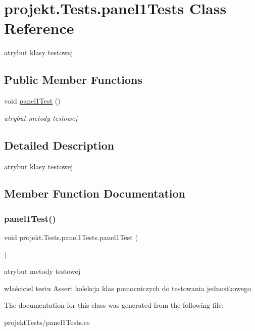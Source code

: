 \hypertarget{classprojekt_1_1_tests_1_1panel1_tests}{}\section{projekt.\+Tests.\+panel1\+Tests Class Reference}
\label{classprojekt_1_1_tests_1_1panel1_tests}


atrybut klasy testowej  


\subsection*{Public Member Functions}
\begin{DoxyCompactItemize}
\item 
void \mbox{\hyperlink{classprojekt_1_1_tests_1_1panel1_tests_a90a569f56e8769cbdeefbe41affdb184}{panel1\+Test}} ()
\begin{DoxyCompactList}\small\item\em atrybut metody testowej \end{DoxyCompactList}\end{DoxyCompactItemize}


\subsection{Detailed Description}
atrybut klasy testowej 

\subsection{Member Function Documentation}
\mbox{\label{classprojekt_1_1_tests_1_1panel1_tests_a90a569f56e8769cbdeefbe41affdb184}} 
\subsubsection{\texorpdfstring{panel1\+Test()}{panel1Test()}}
{\footnotesize\ttfamily void projekt.\+Tests.\+panel1\+Tests.\+panel1\+Test (\begin{DoxyParamCaption}{ }\end{DoxyParamCaption})\hspace{0.3cm}{\ttfamily [inline]}}



atrybut metody testowej 

właściciel testu Assert kolekcja klas pomocniczych do testowania jednostkowego 

The documentation for this class was generated from the following file\+:\begin{DoxyCompactItemize}
\item 
projekt\+Tests/panel1\+Tests.\+cs\end{DoxyCompactItemize}
